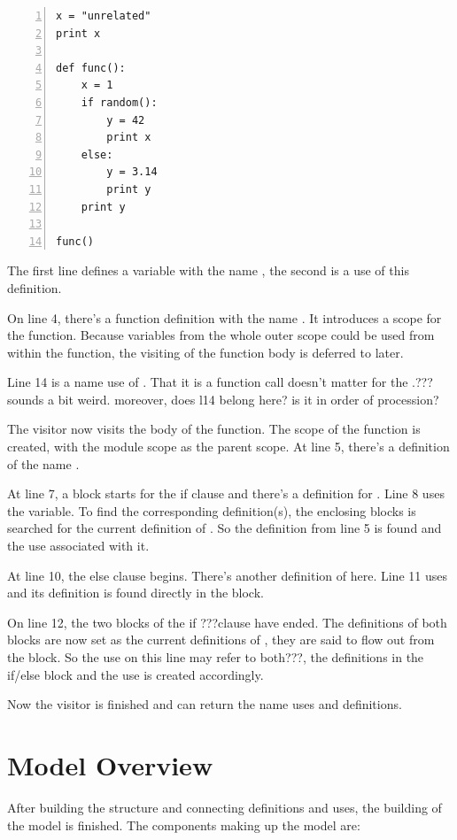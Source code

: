 \documentclass[12pt,halfparskip,DIV11,BCOR10mm]{scrreprt}
\begin{document}
\begin{lstlisting}[numbers=left]
x = "unrelated"
print x

def func():
    x = 1
    if random():
        y = 42
        print x
    else:
        y = 3.14
        print y
    print y

func()
\end{lstlisting}

The first line defines a variable with the name , the second is a use of this definition.

On line 4, there's a function definition with the name . It introduces a scope for the function. Because variables from the whole outer scope could be used from within the function, the visiting of the function body is deferred to later.

Line 14 is a name use of . That it is a function call doesn't matter for the .???sounds a bit weird. moreover, does l14 belong here? is it in order of procession?

The visitor now visits the body of the function. The scope of the function is created, with the module scope as the parent scope. At line 5, there's a definition of the name .

At line 7, a block starts for the if clause and there's a definition for . Line 8 uses the  variable. To find the corresponding definition(s), the enclosing blocks is searched for the current definition of . So the definition from line 5 is found and the use associated with it.

At line 10, the else clause begins. There's another definition of  here. Line 11 uses  and its definition is found directly in the block.

On line 12, the two blocks of the if ???clause have ended. The definitions of both blocks are now set as the current definitions of , they are said to flow out from the block. So the use on this line may refer to both???, the definitions in the if/else block and the use is created accordingly.

Now the visitor is finished and can return the name uses and definitions.

\section{Model Overview}

After building the structure and connecting definitions and uses, the building of the model is finished. The components making up the model are:
\end{document}
